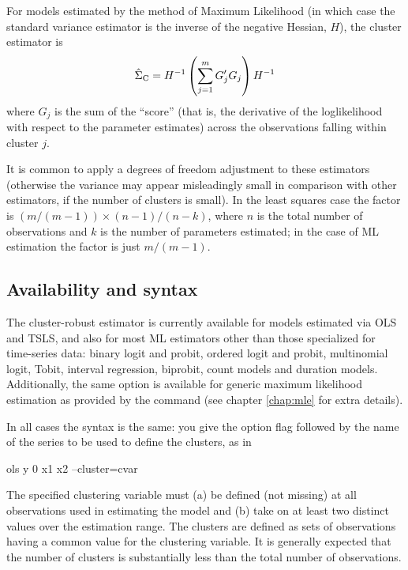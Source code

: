 For models estimated by the method of Maximum Likelihood (in which
case the standard variance estimator is the inverse of the negative
Hessian, $H$), the cluster estimator is
\[
\hat{\Sigma}_{\rm C} = H^{-1} \left(\sum_{j=1}^m G_j' G_j\right)
  H^{-1}
\]
where $G_j$ is the sum of the ``score'' (that is, the derivative of
the loglikelihood with respect to the parameter estimates) across the
observations falling within cluster $j$.

It is common to apply a degrees of freedom adjustment to these
estimators (otherwise the variance may appear misleadingly small in
comparison with other estimators, if the number of clusters is small).
In the least squares case the factor is $(m/(m-1)) \times
(n-1)/(n-k)$, where $n$ is the total number of observations and $k$ is
the number of parameters estimated; in the case of ML estimation the
factor is just $m/(m-1)$.

\subsection{Availability and syntax}

The cluster-robust estimator is currently available for models
estimated via OLS and TSLS, and also for most ML estimators other than
those specialized for time-series data: binary logit and probit,
ordered logit and probit, multinomial logit, Tobit, interval
regression, biprobit, count models and duration models. Additionally,
the same option is available for generic maximum likelihood estimation
as provided by the  command (see chapter \ref{chap:mle} for
extra details).

In all cases the syntax is the same: you give the option flag
 followed by the name of the series to be used to
define the clusters, as in
%
\begin{code}
ols y 0 x1 x2 --cluster=cvar
\end{code}
%
The specified clustering variable must (a) be defined (not missing) at
all observations used in estimating the model and (b) take on at least
two distinct values over the estimation range. The clusters are
defined as sets of observations having a common value for the
clustering variable. It is generally expected that the number of
clusters is substantially less than the total number of observations.

